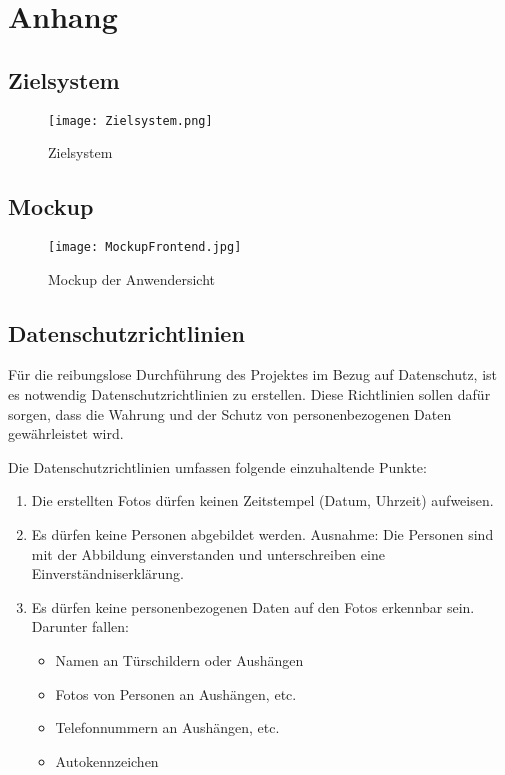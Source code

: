 \section{Anhang}
\label{sec:Anhang}

\subsection{Zielsystem}
\begin{figure}[htb] 
\centering
\texttt{[image: Zielsystem.png]}
\caption[Zielsystem]{Zielsystem\protect\footnotemark}
\label{fig:Zielsystem}
\end{figure}

\clearpage
\subsection{Mockup}
\label{sec:Mockup}

\begin{figure}[htb] 
\centering
\texttt{[image: MockupFrontend.jpg]}
\caption[Mockup der Anwendersicht]{Mockup der Anwendersicht\protect\footnotemark}
\label{fig:MockupFrontend}
\end{figure}

\clearpage
\subsection{Datenschutzrichtlinien}
\label{sec:Datenschutzrichtlinien}

Für die reibungslose Durchführung des Projektes im Bezug auf Datenschutz, ist es 
notwendig Datenschutzrichtlinien zu erstellen. Diese Richtlinien sollen dafür sorgen, 
dass die Wahrung und der Schutz von personenbezogenen Daten gewährleistet wird.

Die Datenschutzrichtlinien umfassen folgende einzuhaltende Punkte:

\begin{enumerate}
  \item Die erstellten Fotos dürfen keinen Zeitstempel (Datum, Uhrzeit) aufweisen.
  \item Es dürfen keine Personen abgebildet werden. 
  Ausnahme: Die Personen sind mit der Abbildung einverstanden und unterschreiben eine Einverständniserklärung.
  \item Es dürfen keine personenbezogenen Daten auf den Fotos erkennbar sein. Darunter fallen:
  \begin{itemize}
    \item Namen an Türschildern oder Aushängen
    \item Fotos von Personen an Aushängen, etc.
    \item Telefonnummern an Aushängen, etc.
    \item Autokennzeichen
  \end{itemize}
\end{enumerate}